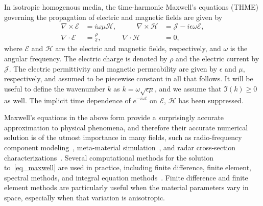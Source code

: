 \documentclass[11pt]{article}
\newcommand{\bcE}{\bm{{\mathcal E}}}
\newcommand{\bcH}{\bm{\mathcal H}}
\newcommand{\bcJ}{\bm{\mathcal J}}
\numberwithin{equation}{section}
\begin{document}
In isotropic homogenous media, the time-harmonic
Maxwell's equations (THME) governing the
propagation of electric and magnetic fields are given by~\cite{papas}
\begin{equation}\label{eq_maxwell}
  \begin{aligned}
    \nabla \times \bcE &= i \omega \mu \bcH, 
    &\qquad \nabla \times \bcH &= \bcJ - i\epsilon\omega \bcE,\\
    \nabla \cdot \bcE &= \frac{\rho}{\epsilon}, & \nabla \cdot \bcH &= 0,
  \end{aligned}
\end{equation}
where $\bcE$ and $\bcH$ are the electric and magnetic fields,
respectively, and $\omega$ is the angular frequency. The electric
charge is denoted by $\rho$ and the electric current by $\bcJ$.
The electric
permittivity and magnetic permeability are given by $\epsilon$ and
$\mu$, respectively, and assumed to be piecewise constant in all that
follows.
 It will be useful to define the wavenumber $k$ as
$k = \omega\sqrt{\epsilon\mu}$, and we assume that $\Im (k) \geq 0$ as well.
The implicit
time dependence of $e^{-i\omega t}$ on $\bcE$, $\bcH$ has been suppressed.


Maxwell's equations in the above form provide a surprisingly accurate
approximation to physical phenomena, and therefore their accurate
numerical solution is of the utmost importance in many fields, such as
radio-frequency component modeling~\cite{kapur-1998}, meta-material
simulation~\cite{gimbutas-2013}, and radar cross-section
characterizations~\cite{youssef1989}.  Several computational methods
for the solution to~\eqref{eq_maxwell} are used in practice, including
finite difference, finite element, spectral methods, and integral
equation
methods~\cite{monk1992finite,kirsch1995finite,nedelec,yee_1966}.
Finite difference and finite element methods are particularly useful
when the material parameters vary in space, especially when that
variation is anisotropic.
\end{document}
